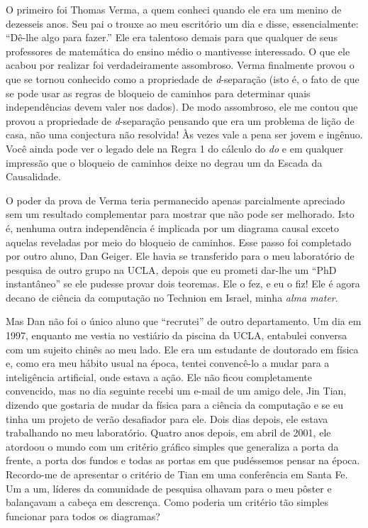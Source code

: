\documentclass[11pt,a5paper,twoside]{book}
\begin{document}
O primeiro foi Thomas Verma, a quem conheci quando ele era um menino de dezesseis anos. Seu pai o trouxe ao meu escritório um dia e disse, essencialmente: “Dê-lhe algo para fazer.” Ele era talentoso demais para que qualquer de seus professores de matemática do ensino médio o mantivesse interessado. O que ele acabou por realizar foi verdadeiramente assombroso. Verma finalmente provou o que se tornou conhecido como a propriedade de \textit{d}-separação (isto é, o fato de que se pode usar as regras de bloqueio de caminhos para determinar quais independências devem valer nos dados). De modo assombroso, ele me contou que provou a propriedade de \textit{d}-separação pensando que era um problema de lição de casa, não uma conjectura não resolvida! Às vezes vale a pena ser jovem e ingênuo. Você ainda pode ver o legado dele na Regra 1 do cálculo do \textit{do} e em qualquer impressão que o bloqueio de caminhos deixe no degrau um da Escada da Causalidade.

O poder da prova de Verma teria permanecido apenas parcialmente apreciado sem um resultado complementar para mostrar que não pode ser melhorado. Isto é, nenhuma outra independência é implicada por um diagrama causal exceto aquelas reveladas por meio do bloqueio de caminhos. Esse passo foi completado por outro aluno, Dan Geiger. Ele havia se transferido para o meu laboratório de pesquisa de outro grupo na UCLA, depois que eu prometi dar-lhe um “PhD instantâneo” se ele pudesse provar dois teoremas. Ele o fez, e eu o fiz! Ele é agora decano de ciência da computação no Technion em Israel, minha \textit{alma mater}.

Mas Dan não foi o único aluno que “recrutei” de outro departamento. Um dia em 1997, enquanto me vestia no vestiário da piscina da UCLA, entabulei conversa com um sujeito chinês ao meu lado. Ele era um estudante de doutorado em física e, como era meu hábito usual na época, tentei convencê-lo a mudar para a inteligência artificial, onde estava a ação. Ele não ficou completamente convencido, mas no dia seguinte recebi um e-mail de um amigo dele, Jin Tian, dizendo que gostaria de mudar da física para a ciência da computação e se eu tinha um projeto de verão desafiador para ele. Dois dias depois, ele estava trabalhando no meu laboratório. Quatro anos depois, em abril de 2001, ele atordoou o mundo com um critério gráfico simples que generaliza a porta da frente, a porta dos fundos e todas as portas em que pudéssemos pensar na época. Recordo-me de apresentar o critério de Tian em uma conferência em Santa Fe. Um a um, líderes da comunidade de pesquisa olhavam para o meu pôster e balançavam a cabeça em descrença. Como poderia um critério tão simples funcionar para todos os diagramas?
\end{document}
